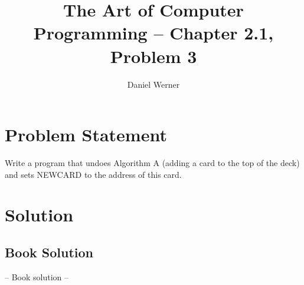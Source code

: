 \documentclass{article}
\title{The Art of Computer Programming -- Chapter 2.1, Problem 3}
\author{Daniel Werner}
\begin{document}
\maketitle

\section*{
    Problem Statement
}

Write a program that undoes Algorithm A (adding a card to the top of the deck) and sets NEWCARD to the address of this card.

\section*{
    Solution
}



\subsection* {
  Book Solution
}

-- Book solution --
\end{document}
